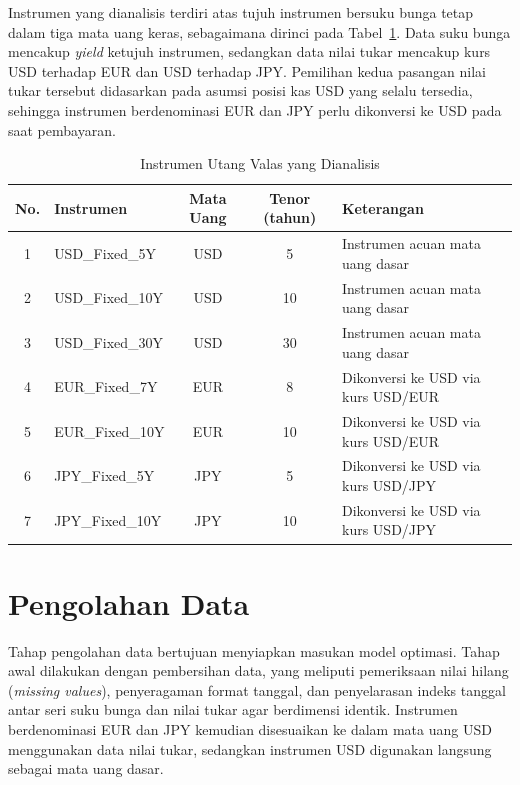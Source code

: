 Instrumen yang dianalisis terdiri atas tujuh instrumen bersuku bunga tetap dalam tiga mata uang keras, sebagaimana dirinci pada Tabel~\ref{tab:instrumen}. Data suku bunga mencakup \textit{yield} ketujuh instrumen, sedangkan data nilai tukar mencakup kurs USD terhadap EUR dan USD terhadap JPY. Pemilihan kedua pasangan nilai tukar tersebut didasarkan pada asumsi posisi kas USD yang selalu tersedia, sehingga instrumen berdenominasi EUR dan JPY perlu dikonversi ke USD pada saat pembayaran.

\begin{table}[H]
    \centering
    \caption{Instrumen Utang Valas yang Dianalisis}
    \label{tab:instrumen}
    \begin{tabularx}{\textwidth}{c l c c X}
    \hline
    \textbf{No.} & \textbf{Instrumen} & \textbf{Mata Uang} & \textbf{Tenor (tahun)}
    & \textbf{Keterangan} \\
    \hline
    1 & USD\_Fixed\_5Y  & USD & 5  & Instrumen acuan mata uang dasar \\
    2 & USD\_Fixed\_10Y & USD & 10 & Instrumen acuan mata uang dasar \\
    3 & USD\_Fixed\_30Y & USD & 30 & Instrumen acuan mata uang dasar \\
    4 & EUR\_Fixed\_7Y  & EUR & 8  & Dikonversi ke USD via kurs USD/EUR \\
    5 & EUR\_Fixed\_10Y & EUR & 10 & Dikonversi ke USD via kurs USD/EUR \\
    6 & JPY\_Fixed\_5Y  & JPY & 5  & Dikonversi ke USD via kurs USD/JPY \\
    7 & JPY\_Fixed\_10Y & JPY & 10 & Dikonversi ke USD via kurs USD/JPY \\
    \hline
    \end{tabularx}
\end{table}


\section{Pengolahan Data}\label{sec:pengolahan-data}
Tahap pengolahan data bertujuan menyiapkan masukan model optimasi. Tahap awal dilakukan dengan pembersihan data, yang meliputi pemeriksaan nilai hilang (\textit{missing values}), penyeragaman format tanggal, dan penyelarasan indeks tanggal antar seri suku bunga dan nilai tukar agar berdimensi identik. Instrumen berdenominasi EUR dan JPY kemudian disesuaikan ke dalam mata uang USD menggunakan data nilai tukar, sedangkan instrumen USD digunakan langsung sebagai mata uang dasar.

